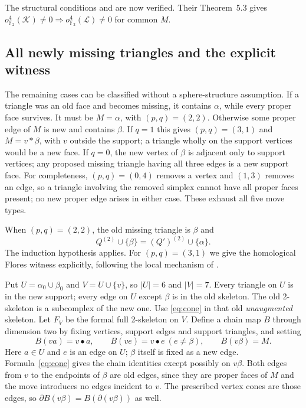 \documentclass[11pt]{article}
\theoremstyle{remark}
\newcommand{\F}{\mathbb F}
\newcommand{\vk}{o^4_{\F_2}}
\begin{document}
The structural conditions and \cite[conditions (I.a)--(II.b)]{NW} are
now verified. Their Theorem~5.3 gives
$\vk(\mathcal K)\ne0\Rightarrow\vk(\mathcal L)\ne0$ for common $M$.

\subsection{All newly missing triangles and the explicit witness}

The remaining cases can be classified without a sphere-structure
assumption. If a triangle was an old face and becomes missing, it
contains $\alpha$, while every proper face survives. It must be
$M=\alpha$, with $(p,q)=(2,2)$. Otherwise some proper edge of $M$ is
new and contains $\beta$. If $q=1$ this gives $(p,q)=(3,1)$ and
$M=v*\beta$, with $v$ outside the support; a triangle wholly on the
support vertices would be a new face. If $q=0$, the new vertex of
$\beta$ is adjacent only to support vertices; any proposed missing
triangle having all three edges is a new support face. For completeness,
$(p,q)=(0,4)$ removes a vertex and $(1,3)$ removes an edge, so a
triangle involving the removed simplex cannot have all proper faces
present; no new proper edge arises in either case. These exhaust
all five move types.

When $(p,q)=(2,2)$, the old missing triangle is $\beta$ and
\[
Q^{(2)}\cup\{\beta\}=(Q')^{(2)}\cup\{\alpha\}.
\]
The induction hypothesis applies. For $(p,q)=(3,1)$ we give the
homological Flores witness explicitly, following the local mechanism
of \cite[proof of Theorem~1.2]{NW}.

Put $U=\alpha_0\cup\beta_0$ and $V=U\cup\{v\}$, so $|U|=6$ and
$|V|=7$. Every triangle on $U$ is in the new support; every edge
on $U$ except $\beta$ is in the old skeleton. The old 2-skeleton
is a subcomplex of the new one. Use \eqref{eq:cone} in that old
\emph{unaugmented} skeleton. Let $F_V$ be the formal full 2-skeleton
on $V$. Define a chain map $B$ through dimension two by fixing
vertices, support edges and support triangles, and setting
\[
B(va)=v\bullet a,\qquad
B(ve)=v\bullet e\ (e\ne\beta),\qquad B(v\beta)=M.
\]
Here $a\in U$ and $e$ is an edge on $U$; $\beta$ itself is fixed
as a new edge. Formula~\eqref{eq:cone} gives the chain identities
except possibly on $v\beta$. Both edges from $v$ to the endpoints
of $\beta$ are old edges, since they are proper faces of $M$ and
the move introduces no edges incident to $v$. The prescribed vertex
cones are those edges, so $\partial B(v\beta)=B(\partial(v\beta))$
as well.
\end{document}
